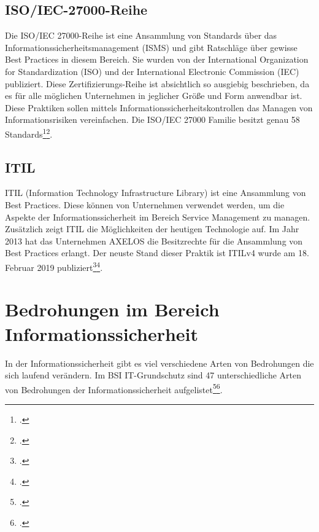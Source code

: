 \subsection{ISO/IEC-27000-Reihe}
Die ISO/IEC 27000-Reihe ist eine Ansammlung von Standards über das Informationssicherheitsmanagement (ISMS) und gibt Ratschläge über gewisse Best Practices in diesem Bereich. Sie wurden von der International Organization for Standardization (ISO) und der International Electronic Commission (IEC) publiziert. 
Diese Zertifizierungs-Reihe ist absichtlich so ausgiebig beschrieben, da es für alle möglichen Unternehmen in jeglicher Größe und Form anwendbar ist.
Diese Praktiken sollen mittels Informationssicherheitskontrollen das Managen von Informationsrisiken vereinfachen. Die ISO/IEC 27000 Familie besitzt genau 58 Standards\footcite{iso-reihe-wiki}\footcite{iso-reihe-gv}.


\subsection{ITIL}
ITIL (Information Technology Infrastructure Library) ist eine Ansammlung von Best Practices. Diese können von Unternehmen verwendet werden, um die Aspekte der Informationssicherheit im Bereich Service Management zu managen. Zusätzlich zeigt ITIL die Möglichkeiten der heutigen Technologie auf. Im Jahr 2013 hat das Unternehmen AXELOS die Besitzrechte für die Ansammlung von Best Practices erlangt.
Der neuste Stand dieser Praktik ist ITILv4 wurde am 18. Februar 2019 publiziert\footcite{Lehrunterlagen-HTL-cloud}\footcite{itil}.


\section{Bedrohungen im Bereich Informationssicherheit}
In der Informationssicherheit gibt es viel verschiedene Arten von Bedrohungen die sich laufend verändern. Im BSI IT-Grundschutz sind 47 unterschiedliche Arten von Bedrohungen der Informationssicherheit aufgelistet\footcite{Lehrunterlagen-HTL-cloud}\footcite{bedrohungen}.


